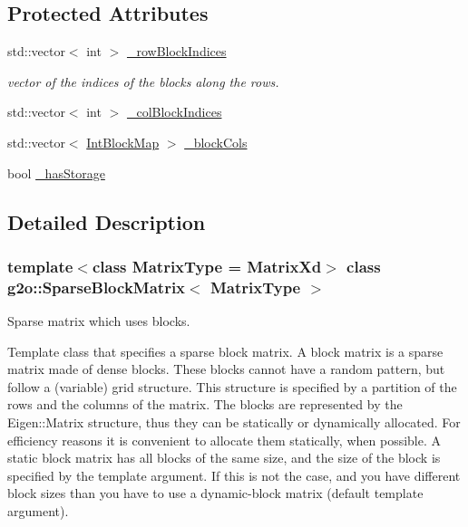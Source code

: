 \subsection*{Protected Attributes}
\begin{DoxyCompactItemize}
\item 
std\+::vector$<$ int $>$ \mbox{\hyperlink{classg2o_1_1_sparse_block_matrix_ab0bd9c6d5b7b8704af1bc679032382e3}{\+\_\+row\+Block\+Indices}}
\begin{DoxyCompactList}\small\item\em vector of the indices of the blocks along the rows. \end{DoxyCompactList}\item 
std\+::vector$<$ int $>$ \mbox{\hyperlink{classg2o_1_1_sparse_block_matrix_aca008740c37d2d00b90f696ab19abb59}{\+\_\+col\+Block\+Indices}}
\item 
std\+::vector$<$ \mbox{\hyperlink{classg2o_1_1_sparse_block_matrix_aaa6ca1ae454ed70f62992b6401645f4e}{Int\+Block\+Map}} $>$ \mbox{\hyperlink{classg2o_1_1_sparse_block_matrix_ae236d56a01ba4d292450a518621b41f8}{\+\_\+block\+Cols}}
\item 
bool \mbox{\hyperlink{classg2o_1_1_sparse_block_matrix_ae3f063a5efc2708b41806ac361fd3ca6}{\+\_\+has\+Storage}}
\end{DoxyCompactItemize}


\subsection{Detailed Description}
\subsubsection*{template$<$class Matrix\+Type = Matrix\+Xd$>$\newline
class g2o\+::\+Sparse\+Block\+Matrix$<$ Matrix\+Type $>$}

Sparse matrix which uses blocks. 

Template class that specifies a sparse block matrix. A block matrix is a sparse matrix made of dense blocks. These blocks cannot have a random pattern, but follow a (variable) grid structure. This structure is specified by a partition of the rows and the columns of the matrix. The blocks are represented by the Eigen\+::\+Matrix structure, thus they can be statically or dynamically allocated. For efficiency reasons it is convenient to allocate them statically, when possible. A static block matrix has all blocks of the same size, and the size of the block is specified by the template argument. If this is not the case, and you have different block sizes than you have to use a dynamic-\/block matrix (default template argument). 

